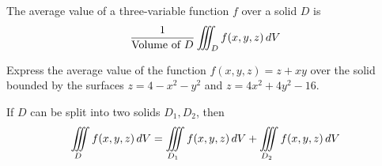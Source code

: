 \documentclass[letterpaper, twoside, 12pt]{book}
\begin{document}
\begin{definition}
  The average value of a three-variable function $f$ over a solid $D$ is
  \[
    \frac{1}{\text{Volume of }D}\iiint_D f(x,y,z)\,d{V}
  \]
\end{definition}

          \begin{problem}
            Express the average value of the function $f(x,y,z)=z+xy$
            over the solid bounded by the surfaces
            $z=4-x^2-y^2$ and $z=4x^2+4y^2-16$.
          \end{problem}

          \begin{solution}

          \end{solution}

          \begin{contributors}

          \end{contributors}

\begin{theorem}
  If $D$ can be split into two solids $D_1,D_2$, then
  \[
    \iiint\limits_D f(x,y,z)\,d{V}
      =
    \iiint\limits_{D_1} f(x,y,z)\,d{V} + \iiint\limits_{D_2} f(x,y,z)\,d{V}
  \]
\end{theorem}
\end{document}
